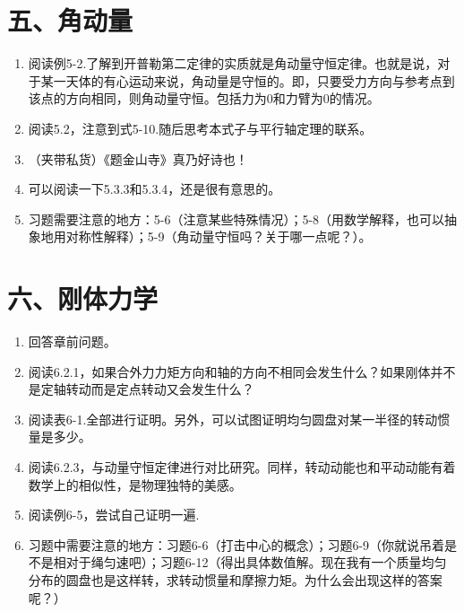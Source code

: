 \documentclass[12pt,a4paper]{article}
\begin{document}
\section{五、角动量}
\begin{enumerate}[label=\arabic*.,leftmargin=*]
    \item 阅读例5-2.了解到开普勒第二定律的实质就是角动量守恒定律。也就是说，对于某一天体的有心运动来说，角动量是守恒的。即，只要受力方向与参考点到该点的方向相同，则角动量守恒。包括力为0和力臂为0的情况。

    \item 阅读5.2，注意到式5-10.随后思考本式子与平行轴定理的联系。

    \item （夹带私货）《题金山寺》真乃好诗也！

    \item 可以阅读一下5.3.3和5.3.4，还是很有意思的。

    \item 习题需要注意的地方：5-6（注意某些特殊情况）；5-8（用数学解释，也可以抽象地用对称性解释）；5-9（角动量守恒吗？关于哪一点呢？）。
\end{enumerate}

\section{六、刚体力学}
\begin{enumerate}[label=\arabic*.,leftmargin=*]
    \item 回答章前问题。

    \item 阅读6.2.1，如果合外力力矩方向和轴的方向不相同会发生什么？如果刚体并不是定轴转动而是定点转动又会发生什么？

    \item 阅读表6-1.全部进行证明。另外，可以试图证明均匀圆盘对某一半径的转动惯量是多少。

    \item 阅读6.2.3，与动量守恒定律进行对比研究。同样，转动动能也和平动动能有着数学上的相似性，是物理独特的美感。

    \item 阅读例6-5，尝试自己证明一遍.

    \item 习题中需要注意的地方：习题6-6（打击中心的概念）；习题6-9（你就说吊着是不是相对于绳匀速吧）；习题6-12（得出具体数值解。现在我有一个质量均匀分布的圆盘也是这样转，求转动惯量和摩擦力矩。为什么会出现这样的答案呢？）
\end{enumerate}
\end{document}
